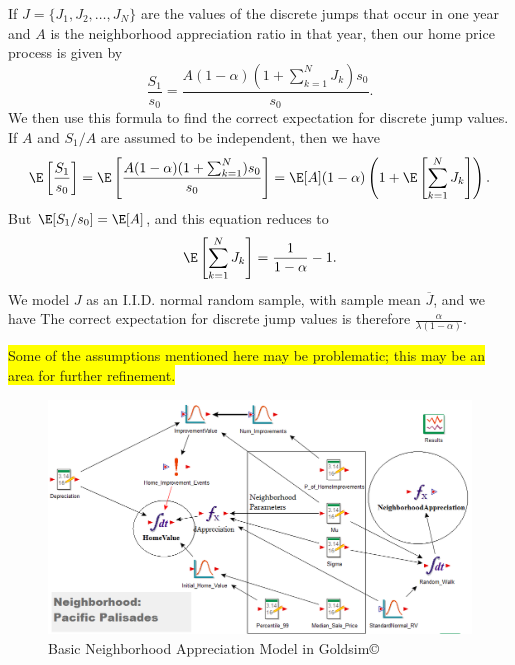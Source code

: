 \documentclass[twoside]{article}
\newcommand{\hilight}[1]{\colorbox{yellow}{#1}}
\begin{document}
If $J=\{J_1, J_2, \dots, J_N\}$ are the values of the discrete jumps that occur in one year and $A$ is the neighborhood appreciation ratio in that year, then our home price process is given by
$$
\frac{S_1}{ s_0}=\frac{A(1-\alpha)(1+\sum_{k=1}^NJ_k)s_0}{s_0}.
$$
We then use this formula to find the correct expectation for discrete jump values. If $A$ and $S_1/A$ are assumed to be independent, then we have
$$
\E\left[\frac{S_1}{ s_0}\right]=\E\left[\frac{A(1-\alpha)(1+\sum_{k=1}^N)s_0}{s_0}\right] = \E[A](1-\alpha)\left(1+\E\left[\sum_{k=1}^NJ_k\right]\right).
 $$ 
But $\E[S_1/s_0]=\E[A]$, and this equation reduces to
$$
\E\left[\sum_{k=1}^NJ_k\right]=\frac{1}{1-\alpha}-1.
$$
We model $J$ as an I.I.D. normal random sample, with sample mean \newcommand{\Jbar}{\overline{J}}$\Jbar$, and we have
\ali{
\E\left[\sum_{k=1}^NJ_k\right]&=\E\left[N\Jbar\right]
\\&=\E\left[N\right]\E\left[\Jbar\right]
\\&=\lambda\E\left[\Jbar\right]
}
The correct expectation for discrete jump values is therefore $\frac{\alpha}{\lambda(1-\alpha)}$.


\hilight{Some of the assumptions mentioned here may be problematic; this may be an area for further refinement.}\\


\begin{figure}

\includegraphics[scale=.35]{GoldSimScreenshot3.png}
\caption{Basic Neighborhood Appreciation Model in Goldsim\copyright}
\end{figure}

\end{document}

